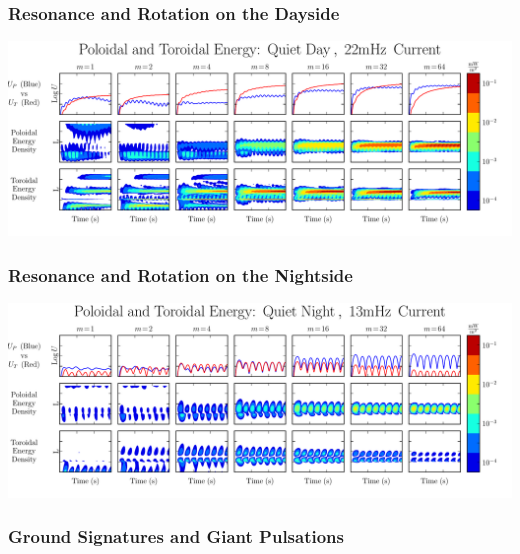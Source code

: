 \documentclass{beamer}
\begin{document}
\begin{frame}
\frametitle{Resonance and Rotation on the Dayside}

\vfill

\includegraphics[width=\textwidth]{figures/energy_day.pdf}

\end{frame}


\begin{frame}
\frametitle{Resonance and Rotation on the Nightside}

\vfill

\includegraphics[width=\textwidth]{figures/energy_night.pdf}

\end{frame}


\begin{frame}
\frametitle{Ground Signatures and Giant Pulsations}
\end{frame}

\end{document}
